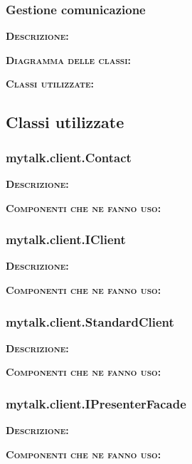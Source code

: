 \subsubsection{Gestione comunicazione}
\begin{description}
	\item{\scshape\bfseries Descrizione:} 
	\item{\scshape\bfseries Diagramma delle classi:}
	\item{\scshape\bfseries Classi utilizzate:} 
\end{description}

\subsection{Classi utilizzate}

\subsubsection{mytalk.client.Contact}
\begin{description}
	\item{\scshape\bfseries Descrizione:} 
	\item{\scshape\bfseries Componenti che ne fanno uso:} 
\end{description}

\subsubsection{mytalk.client.IClient}
\begin{description}
	\item{\scshape\bfseries Descrizione:} 
	\item{\scshape\bfseries Componenti che ne fanno uso:} 
\end{description}

\subsubsection{mytalk.client.StandardClient}
\begin{description}
	\item{\scshape\bfseries Descrizione:} 
	\item{\scshape\bfseries Componenti che ne fanno uso:} 
\end{description}

\subsubsection{mytalk.client.IPresenterFacade}
\begin{description}
	\item{\scshape\bfseries Descrizione:} 
	\item{\scshape\bfseries Componenti che ne fanno uso:} 
\end{description}

